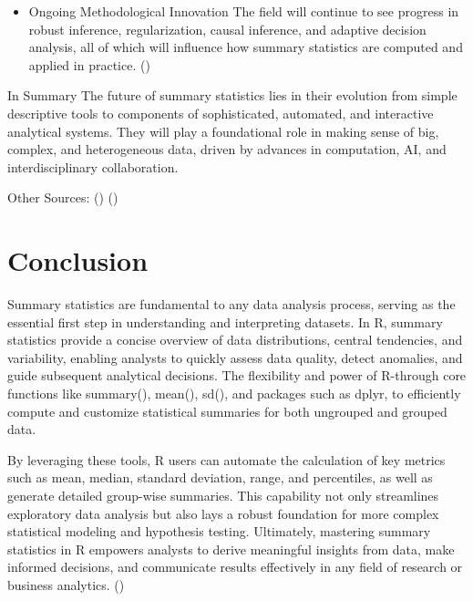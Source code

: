 \documentclass[
  man,
  floatsintext,
  longtable,
  nolmodern,
  notxfonts,
  notimes,
  colorlinks=true,linkcolor=blue,citecolor=blue,urlcolor=blue]{apa7}
\providecommand{\tightlist}{%
  \setlength{\itemsep}{0pt}\setlength{\parskip}{0pt}}
\begin{document}
\begin{itemize}
\tightlist
\item
  Ongoing Methodological Innovation The field will continue to see
  progress in robust inference, regularization, causal inference, and
  adaptive decision analysis, all of which will influence how summary
  statistics are computed and applied in practice.
  ()
\end{itemize}

In Summary The future of summary statistics lies in their evolution from
simple descriptive tools to components of sophisticated, automated, and
interactive analytical systems. They will play a foundational role in
making sense of big, complex, and heterogeneous data, driven by advances
in computation, AI, and interdisciplinary collaboration.

Other Sources: ()
()

\newpage

\section{Conclusion}\label{conclusion}

Summary statistics are fundamental to any data analysis process, serving
as the essential first step in understanding and interpreting datasets.
In R, summary statistics provide a concise overview of data
distributions, central tendencies, and variability, enabling analysts to
quickly assess data quality, detect anomalies, and guide subsequent
analytical decisions. The flexibility and power of R-through core
functions like summary(), mean(), sd(), and packages such as dplyr, to
efficiently compute and customize statistical summaries for both
ungrouped and grouped data.

By leveraging these tools, R users can automate the calculation of key
metrics such as mean, median, standard deviation, range, and
percentiles, as well as generate detailed group-wise summaries. This
capability not only streamlines exploratory data analysis but also lays
a robust foundation for more complex statistical modeling and hypothesis
testing. Ultimately, mastering summary statistics in R empowers analysts
to derive meaningful insights from data, make informed decisions, and
communicate results effectively in any field of research or business
analytics. ()
\end{document}

